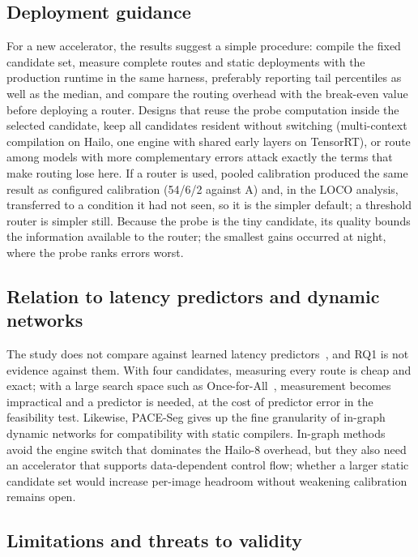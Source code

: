 \documentclass[a4paper,5p]{elsarticle}
\newcommand{\method}{PACE-Seg}
\begin{document}
\subsection{Deployment guidance}

For a new accelerator, the results suggest a simple procedure: compile the fixed candidate set, measure complete routes and static deployments with the production runtime in the same harness, preferably reporting tail percentiles as well as the median, and compare the routing overhead with the break-even value before deploying a router. Designs that reuse the probe computation inside the selected candidate, keep all candidates resident without switching (multi-context compilation on Hailo, one engine with shared early layers on TensorRT), or route among models with more complementary errors attack exactly the terms that make routing lose here. If a router is used, pooled calibration produced the same result as configured calibration (54/6/2 against A) and, in the LOCO analysis, transferred to a condition it had not seen, so it is the simpler default; a threshold router is simpler still. Because the probe is the tiny candidate, its quality bounds the information available to the router; the smallest gains occurred at night, where the probe ranks errors worst.

\subsection{Relation to latency predictors and dynamic networks}

The study does not compare against learned latency predictors~\cite{zhang2021nnmeter}, and RQ1 is not evidence against them. With four candidates, measuring every route is cheap and exact; with a large search space such as Once-for-All~\cite{cai2020ofa}, measurement becomes impractical and a predictor is needed, at the cost of predictor error in the feasibility test. Likewise, \method{} gives up the fine granularity of in-graph dynamic networks for compatibility with static compilers. In-graph methods avoid the engine switch that dominates the Hailo-8 overhead, but they also need an accelerator that supports data-dependent control flow; whether a larger static candidate set would increase per-image headroom without weakening calibration remains open.

\subsection{Limitations and threats to validity}
\label{sec:limitations}
\end{document}
